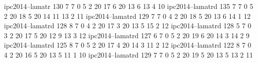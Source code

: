 ipc2014--lamatr   130  7    7    0    5    2    20   17   6    20   13   6    13   4    10
ipc2014--lamatrd  135  7    7    0    5    2    20   18   5    20   14   11   13   2    11
ipc2014--lamatrd  129  7    7    0    4    2    20   18   5    20   13   6    14   1    12
ipc2014--lamatrd  128  8    7    0    4    2    20   17   3    20   13   5    15   2    12
ipc2014--lamatrd  128  5    7    0    3    2    20   17   5    20   12   9    13   3    12
ipc2014--lamatrd  127  6    7    0    5    2    20   19   6    20   14   3    14   2    9
ipc2014--lamatrd  125  8    7    0    5    2    20   17   4    20   14   3    11   2    12
ipc2014--lamatrd  122  8    7    0    4    2    20   16   5    20   13   5    11   1    10
ipc2014--lamatrd  129  7    7    0    5    2    20   19   5    20   13   5    13   2    11
